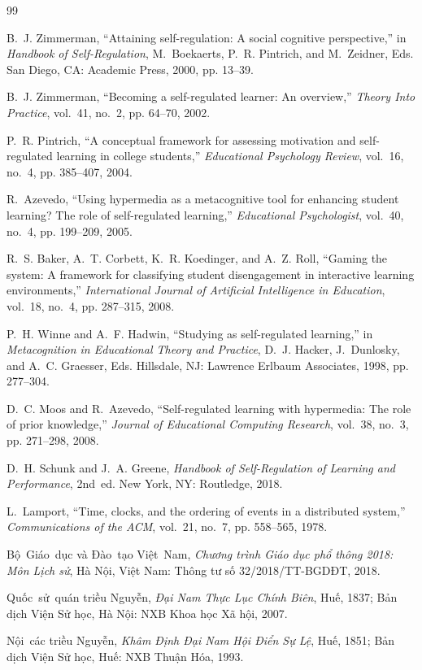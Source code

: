 \documentclass[11pt,a4paper]{article}
\begin{document}
\begin{thebibliography}{99}

B.~J. Zimmerman, ``Attaining self-regulation: A social cognitive perspective,'' in \emph{Handbook of Self-Regulation}, M.~Boekaerts, P.~R. Pintrich, and M.~Zeidner, Eds. San Diego, CA: Academic Press, 2000, pp. 13--39.

B.~J. Zimmerman, ``Becoming a self-regulated learner: An overview,'' \emph{Theory Into Practice}, vol.~41, no.~2, pp. 64--70, 2002.

P.~R. Pintrich, ``A conceptual framework for assessing motivation and self-regulated learning in college students,'' \emph{Educational Psychology Review}, vol.~16, no.~4, pp. 385--407, 2004.

R.~Azevedo, ``Using hypermedia as a metacognitive tool for enhancing student learning? The role of self-regulated learning,'' \emph{Educational Psychologist}, vol.~40, no.~4, pp. 199--209, 2005.

R.~S. Baker, A.~T. Corbett, K.~R. Koedinger, and A.~Z. Roll, ``Gaming the system: A framework for classifying student disengagement in interactive learning environments,'' \emph{International Journal of Artificial Intelligence in Education}, vol.~18, no.~4, pp. 287--315, 2008.

P.~H. Winne and A.~F. Hadwin, ``Studying as self-regulated learning,'' in \emph{Metacognition in Educational Theory and Practice}, D.~J. Hacker, J.~Dunlosky, and A.~C. Graesser, Eds. Hillsdale, NJ: Lawrence Erlbaum Associates, 1998, pp. 277--304.

D.~C. Moos and R.~Azevedo, ``Self-regulated learning with hypermedia: The role of prior knowledge,'' \emph{Journal of Educational Computing Research}, vol.~38, no.~3, pp. 271--298, 2008.

D.~H. Schunk and J.~A. Greene, \emph{Handbook of Self-Regulation of Learning and Performance}, 2nd~ed. New York, NY: Routledge, 2018.

L.~Lamport, ``Time, clocks, and the ordering of events in a distributed system,'' \emph{Communications of the ACM}, vol.~21, no.~7, pp. 558--565, 1978.

Bộ~Giáo~dục và Đào~tạo Việt~Nam, \emph{Chương trình Giáo dục phổ thông 2018: Môn Lịch sử}, Hà Nội, Việt Nam: Thông tư số 32/2018/TT-BGDĐT, 2018.

Quốc~sử~quán triều Nguyễn, \emph{Đại Nam Thực Lục Chính Biên}, Huế, 1837; Bản dịch Viện Sử học, Hà Nội: NXB Khoa học Xã hội, 2007.

Nội~các triều Nguyễn, \emph{Khâm Định Đại Nam Hội Điển Sự Lệ}, Huế, 1851; Bản dịch Viện Sử học, Huế: NXB Thuận Hóa, 1993.

\end{thebibliography}
\end{document}
